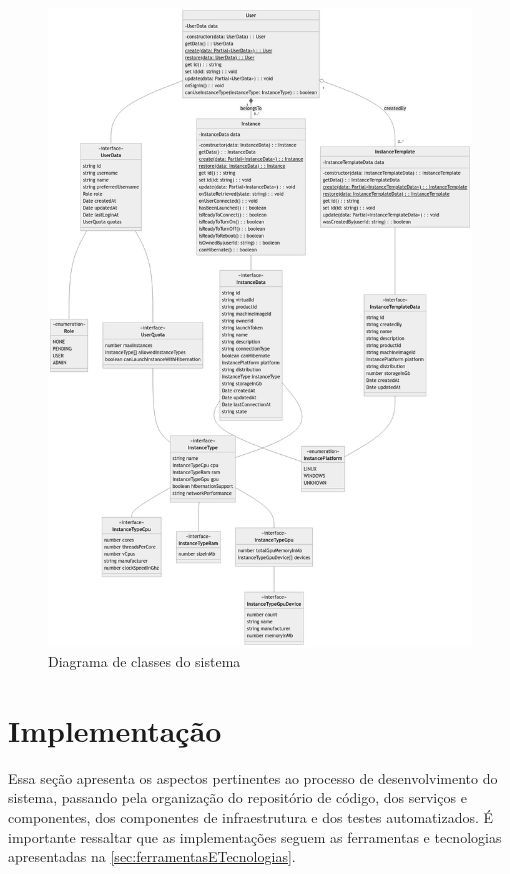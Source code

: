 \begin{figure}[H]
\caption{Diagrama de classes do sistema}
\label{fig:diagramaDeClasses}
\includegraphics[width=\textwidth]{capitulos/2-metodologia/files/class-diagram.png}
\end{figure}

\section{Implementa\c{c}\~ao}
\label{sec:implementacao}

Essa seção apresenta os aspectos pertinentes ao processo de desenvolvimento do sistema, passando pela organização do repositório de código, dos serviços e componentes, dos componentes de infraestrutura e dos testes automatizados. É importante ressaltar que as implementações seguem as ferramentas e tecnologias apresentadas na \autoref{sec:ferramentasETecnologias}.

